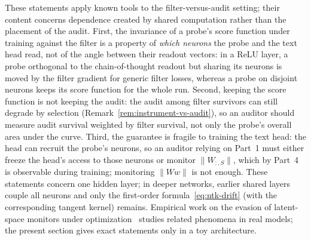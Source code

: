 \begin{remark}
These statements apply known tools to the filter-versus-audit setting; their content concerns dependence created by shared computation rather than the placement of the audit. First, the invariance of a probe's score function under training against the filter is a property of \emph{which neurons} the probe and the text head read, not of the angle between their readout vectors: in a ReLU layer, a probe orthogonal to the chain-of-thought readout but sharing its neurons is moved by the filter gradient for generic filter losses, whereas a probe on disjoint neurons keeps its score function for the whole run. Second, keeping the score function is not keeping the audit: the audit among filter survivors can still degrade by selection (Remark~\ref{rem:instrument-vs-audit}), so an auditor should measure audit survival weighted by filter survival, not only the probe's overall area under the curve. Third, the guarantee is fragile to training the text head: the head can recruit the probe's neurons, so an auditor relying on Part~1 must either freeze the head's access to those neurons or monitor $\|W_{:,S}\|$, which by Part~4 is observable during training; monitoring $\|Ww\|$ is not enough. These statements concern one hidden layer; in deeper networks, earlier shared layers couple all neurons and only the first-order formula~\eqref{eq:ntk-drift} (with the corresponding tangent kernel) remains. Empirical work on the evasion of latent-space monitors under optimization~\cite{bailey2024,gupta2025} studies related phenomena in real models; the present section gives exact statements only in a toy architecture.
\end{remark}

